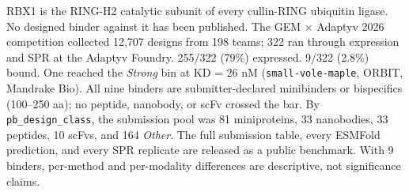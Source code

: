 RBX1 is the RING-H2 catalytic subunit of every cullin-RING ubiquitin
ligase. No designed binder against it has been published. The GEM ×
Adaptyv 2026 competition collected 12,707 designs from 198 teams; 322
ran through expression and SPR at the Adaptyv Foundry. 255/322 (79\%)
expressed. 9/322 (2.8\%) bound. One reached the \emph{Strong} bin at KD
= 26 nM (\texttt{small-vole-maple}, ORBIT, Mandrake Bio). All nine
binders are submitter-declared minibinders or bispecifics (100--250
aa); no peptide, nanobody, or scFv crossed the bar. By
\texttt{pb\_design\_class}, the submission pool was 81 miniproteins,
33 nanobodies, 33 peptides, 10 scFvs, and 164 \emph{Other}. The full submission table, every ESMFold
prediction, and every SPR replicate are released as a public benchmark.
With 9 binders, per-method and per-modality differences are descriptive,
not significance claims.
